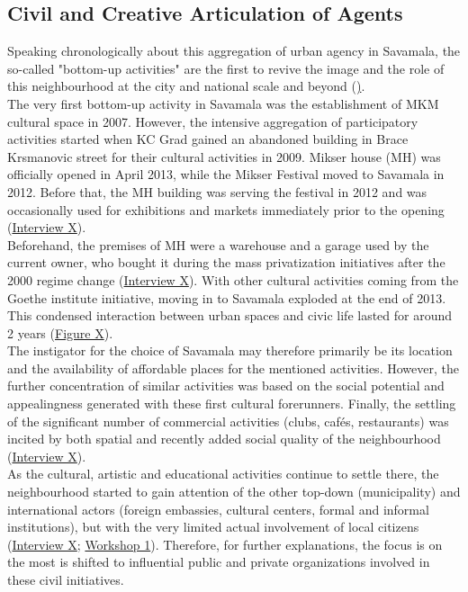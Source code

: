 \documentclass[11pt]{report}
\begin{document}
\subsection{Civil and Creative Articulation of Agents}

Speaking chronologically about this aggregation of urban agency in Savamala, the so-called "bottom-up activities" are the first to revive the image and the role of this neighbourhood at the city and national scale and beyond (\href{Section 4.2.3}\href{Section 4.2.3}).
\\

The very first bottom-up activity in Savamala was the establishment of MKM cultural space in 2007. However, the intensive aggregation of participatory activities started when KC Grad gained an abandoned building in Brace Krsmanovic street for their cultural activities in 2009.
Mikser house (MH) was officially opened in April 2013, while the Mikser Festival moved to Savamala in 2012. Before that, the MH building was serving the festival in 2012 and was occasionally used for exhibitions and markets immediately prior to the opening
(\href{InterviewX}{Interview X}).
\\

Beforehand, the premises of MH were a warehouse and a garage used by the current owner, who bought it during the mass privatization initiatives after the 2000 regime change (\href{InterviewX}{Interview X}).
With other cultural activities coming from the Goethe institute initiative, moving in to Savamala exploded at the end of 2013. This condensed interaction between urban spaces and civic life lasted for around 2 years (\href{Figure 2}{Figure X}).
\\

The instigator for the choice of Savamala may therefore primarily be its location and the availability of affordable places for the mentioned activities.
However, the further concentration of similar activities was based on the social potential and appealingness generated with these first cultural forerunners.
Finally, the settling of the significant number of commercial activities (clubs, cafés, restaurants) was incited by both spatial and recently added social quality of the neighbourhood
(\href{InterviewX}{Interview X}).
\\

As the cultural, artistic and educational activities continue to settle there, the neighbourhood started to gain attention of the other top-down (municipality) and international actors (foreign embassies, cultural centers, formal and informal institutions), but with the very limited actual involvement of local citizens
(\href{InterviewX}{Interview X};
\href{Expert Workshop}{Workshop 1}).
Therefore, for further explanations, the focus is on the most is shifted to influential public and private organizations involved in these civil initiatives.
\\
\end{document}

